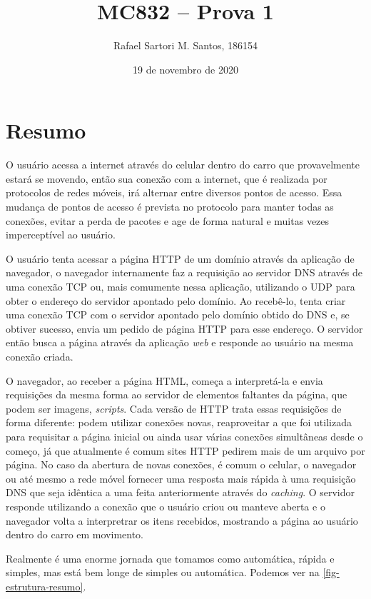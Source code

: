 \documentclass[brazilian,a4paper,twocolumn]{article}
\title{MC832 -- Prova 1}
\author{Rafael Sartori M. Santos, 186154}
\date{19 de novembro de 2020}
\begin{document}
\maketitle

\section{Resumo}

O usuário acessa a internet através do celular dentro do carro que provavelmente estará se movendo, então sua conexão com a internet, que é realizada por protocolos de redes móveis, irá alternar entre diversos pontos de acesso. Essa mudança de pontos de acesso é prevista no protocolo para manter todas as conexões, evitar a perda de pacotes e age de forma natural e muitas vezes imperceptível ao usuário.

O usuário tenta acessar a página HTTP de um domínio através da aplicação de navegador, o navegador internamente faz a requisição ao servidor DNS através de uma conexão TCP ou, mais comumente nessa aplicação, utilizando o UDP para obter o endereço do servidor apontado pelo domínio. Ao recebê-lo, tenta criar uma conexão TCP com o servidor apontado pelo domínio obtido do DNS e, se obtiver sucesso, envia um pedido de página HTTP para esse endereço. O servidor então busca a página através da aplicação \textit{web} e responde ao usuário na mesma conexão criada.

O navegador, ao receber a página HTML, começa a interpretá-la e envia requisições da mesma forma ao servidor de elementos faltantes da página, que podem ser imagens, \textit{scripts}. Cada versão de HTTP trata essas requisições de forma diferente: podem utilizar conexões novas, reaproveitar a que foi utilizada para requisitar a página inicial ou ainda usar várias conexões simultâneas desde o começo, já que atualmente é comum sites HTTP pedirem mais de um arquivo por página. No caso da abertura de novas conexões, é comum o celular, o navegador ou até mesmo a rede móvel fornecer uma resposta mais rápida à uma requisição DNS que seja idêntica a uma feita anteriormente através do \textit{caching}. O servidor responde utilizando a conexão que o usuário criou ou manteve aberta e o navegador volta a interpretrar os itens recebidos, mostrando a página ao usuário dentro do carro em movimento.

Realmente é uma enorme jornada que tomamos como automática, rápida e simples, mas está bem longe de simples ou automática. Podemos ver na \cref{fig-estrutura-resumo}.
\end{document}
